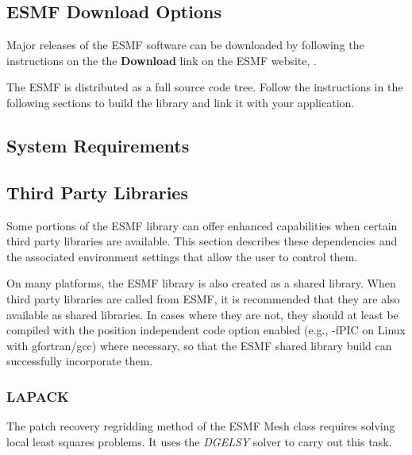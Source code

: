 
\subsection{ESMF Download Options}

Major releases of the ESMF software can be downloaded by following
the instructions on the the {\bf Download} link on the ESMF 
website, .

The ESMF is distributed as a full source code tree.
Follow the instructions in the following sections
to build the library and link it with your application.


\subsection{System Requirements}
\label{sec:systemreq}


\subsection{Third Party Libraries}
\label{sec:ThirdParty}

Some portions of the ESMF library can offer enhanced capabilities when
certain third party libraries are available. This section describes
these dependencies and the associated environment settings
that allow the user to control them.

On many platforms, the ESMF library is also created as a shared library.
When third party libraries are called from ESMF, it is recommended that they are
also available as shared libraries.  In cases where they are not, they should at
least be compiled with the position independent code option enabled (e.g., -fPIC on
Linux with gfortran/gcc) where necessary, so that the ESMF shared library
build can successfully incorporate them.

\subsubsection{LAPACK}
\label{sec:lapack}
The patch recovery regridding method of the ESMF Mesh class requires solving
local least squares problems. It uses the
 {\it DGELSY} solver 
to carry out this task.


